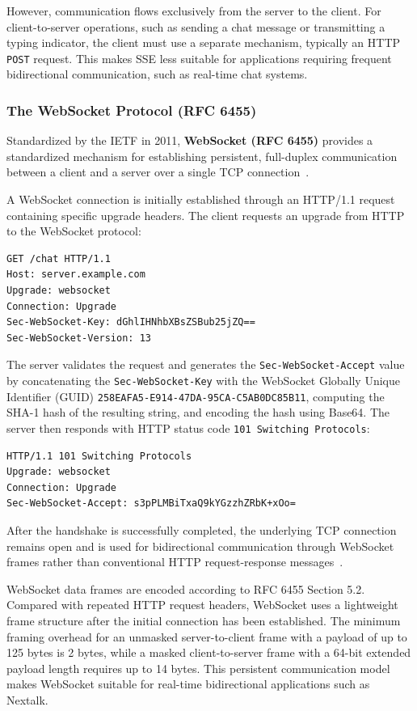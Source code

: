 \documentclass[12pt, a4paper]{article}
\begin{document}
However, communication flows exclusively from the server to the client. For client-to-server operations, such as sending a chat message or transmitting a typing indicator, the client must use a separate mechanism, typically an HTTP \texttt{POST} request. This makes SSE less suitable for applications requiring frequent bidirectional communication, such as real-time chat systems.

\subsubsection{The WebSocket Protocol (RFC 6455)}

Standardized by the IETF in 2011, \textbf{WebSocket (RFC 6455)} provides a standardized mechanism for establishing persistent, full-duplex communication between a client and a server over a single TCP connection~\cite{rfc6455}.

A WebSocket connection is initially established through an HTTP/1.1 request containing specific upgrade headers. The client requests an upgrade from HTTP to the WebSocket protocol:

\begin{lstlisting}[caption={WebSocket Client Upgrade Request}]
GET /chat HTTP/1.1
Host: server.example.com
Upgrade: websocket
Connection: Upgrade
Sec-WebSocket-Key: dGhlIHNhbXBsZSBub25jZQ==
Sec-WebSocket-Version: 13
\end{lstlisting}

The server validates the request and generates the \texttt{Sec-WebSocket-Accept} value by concatenating the \texttt{Sec-WebSocket-Key} with the WebSocket Globally Unique Identifier (GUID) \texttt{258EAFA5-E914-47DA-95CA-C5AB0DC85B11}, computing the SHA-1 hash of the resulting string, and encoding the hash using Base64. The server then responds with HTTP status code \texttt{101 Switching Protocols}:

\begin{lstlisting}[caption={WebSocket Server Upgrade Response}]
HTTP/1.1 101 Switching Protocols
Upgrade: websocket
Connection: Upgrade
Sec-WebSocket-Accept: s3pPLMBiTxaQ9kYGzzhZRbK+xOo=
\end{lstlisting}

After the handshake is successfully completed, the underlying TCP connection remains open and is used for bidirectional communication through WebSocket frames rather than conventional HTTP request-response messages~\cite{rfc6455}.

WebSocket data frames are encoded according to RFC 6455 Section 5.2. Compared with repeated HTTP request headers, WebSocket uses a lightweight frame structure after the initial connection has been established. The minimum framing overhead for an unmasked server-to-client frame with a payload of up to 125 bytes is 2 bytes, while a masked client-to-server frame with a 64-bit extended payload length requires up to 14 bytes. This persistent communication model makes WebSocket suitable for real-time bidirectional applications such as Nextalk.
\end{document}
